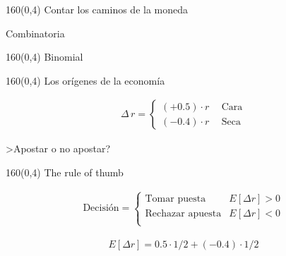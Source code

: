 \documentclass[shownotes,aspectratio=169]{beamer}
\begin{document}
\begin{frame}[plain]
 \begin{textblock}{160}(0,4)
  \centering \Large Contar los caminos de la moneda
 \end{textblock}
 
 Combinatoria
 
\end{frame}


\begin{frame}[plain]
 \begin{textblock}{160}(0,4)
  \centering \Large Binomial
 \end{textblock}
 
 
\end{frame}




\begin{frame}[plain]
 \begin{textblock}{160}(0,4)
  \centering \Large Los orígenes de la economía
 \end{textblock}
 \vspace{1cm}
 
 \begin{align*}
 \Delta \,r = 
      \begin{cases*}
       (+0.5)\cdot r & \ \ \text{Cara} \\
       (-0.4)\cdot r & \ \ \text{Seca}
    \end{cases*}
 \end{align*}

 \vspace{0.5cm}
 
 \centering
 
 >Apostar o no apostar?
 
\end{frame}

\begin{frame}[plain]
 \begin{textblock}{160}(0,4)
  \centering \Large The rule of thumb
 \end{textblock}
 
 \begin{align*}
 \text{Decisión} = 
 \begin{cases*}
  \text{Tomar puesta} & E[\Delta r] > 0 \\ 
  \text{Rechazar apuesta} & E[\Delta r] < 0 \\
 \end{cases*}
\end{align*}

\begin{align*}
  E[\Delta r] = 0.5 \cdot 1/2 + (-0.4) \cdot 1/2
\end{align*}

\end{frame}
\end{document}
